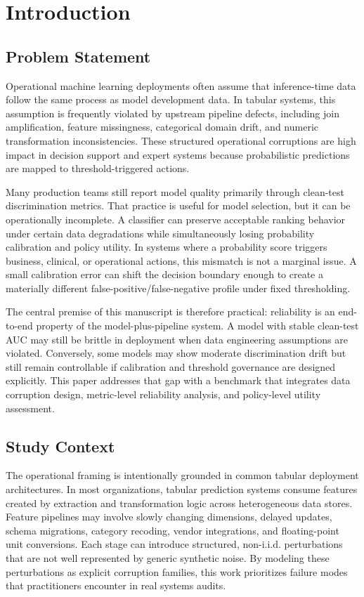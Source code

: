 \documentclass{AuthorGuide/ijitcs}
\author*{Kyriakos Kartas}{Independent Researcher, Greece}{mail@kkartas.gr}{https://orcid.org/0009-0001-6477-4676}
\begin{document}
\maketitle

\section{Introduction}
\subsection{Problem Statement}
Operational machine learning deployments often assume that inference-time data follow the same process as model development data. In tabular systems, this assumption is frequently violated by upstream pipeline defects, including join amplification, feature missingness, categorical domain drift, and numeric transformation inconsistencies. These structured operational corruptions are high impact in decision support and expert systems because probabilistic predictions are mapped to threshold-triggered actions.

Many production teams still report model quality primarily through clean-test discrimination metrics. That practice is useful for model selection, but it can be operationally incomplete. A classifier can preserve acceptable ranking behavior under certain data degradations while simultaneously losing probability calibration and policy utility. In systems where a probability score triggers business, clinical, or operational actions, this mismatch is not a marginal issue. A small calibration error can shift the decision boundary enough to create a materially different false-positive/false-negative profile under fixed thresholding.

The central premise of this manuscript is therefore practical: reliability is an end-to-end property of the model-plus-pipeline system. A model with stable clean-test AUC may still be brittle in deployment when data engineering assumptions are violated. Conversely, some models may show moderate discrimination drift but still remain controllable if calibration and threshold governance are designed explicitly. This paper addresses that gap with a benchmark that integrates data corruption design, metric-level reliability analysis, and policy-level utility assessment.

\subsection{Study Context}
The operational framing is intentionally grounded in common tabular deployment architectures. In most organizations, tabular prediction systems consume features created by extraction and transformation logic across heterogeneous data stores. Feature pipelines may involve slowly changing dimensions, delayed updates, schema migrations, category recoding, vendor integrations, and floating-point unit conversions. Each stage can introduce structured, non-i.i.d. perturbations that are not well represented by generic synthetic noise. By modeling these perturbations as explicit corruption families, this work prioritizes failure modes that practitioners encounter in real systems audits.
\end{document}
